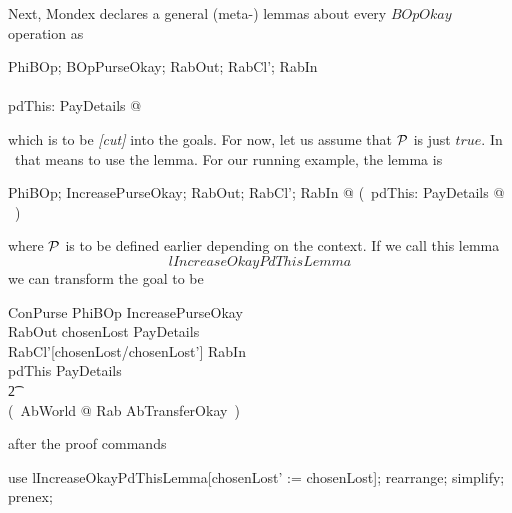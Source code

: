 Next, Mondex declares a general (meta-) lemmas about every $BOpOkay$ operation as
%
\begin{gzed}
   PhiBOp; BOpPurseOkay; RabOut; RabCl'; RabIn \\
   \shows \\
   \exists pdThis: PayDetails @ \pdThisPred
\end{gzed}
%
which is to be \textit{[cut]} into the goals. For now, let us assume that $\mathcal{P}$ is just $true$.
In \zeves\ that means to \textsf{use} the lemma. For our running example, the lemma is
%
\begin{gzed}
   \forall PhiBOp; IncreasePurseOkay; RabOut; RabCl'; RabIn @ (~\exists pdThis: PayDetails @ \pdThisPred~)
\end{gzed}
%
where $\mathcal{P}$ is to be defined earlier depending on the context. If we call this lemma
\[
lIncreaseOkayPdThisLemma
\]
we can transform the goal to be
%
\begin{gzed}
    \Delta ConPurse \land PhiBOp \land IncreasePurseOkay \\
    \land RabOut \land chosenLost \in \power PayDetails \\
    \land RabCl'[chosenLost/chosenLost'] \land RabIn \\
    \land pdThis \in PayDetails \land \pdThisPred \\
\t2 \implies \\
    (~\exists AbWorld @ Rab \land AbTransferOkay~)
\end{gzed}
%
after the proof commands
%
\begin{gzproof}
   use lIncreaseOkayPdThisLemma[chosenLost' := chosenLost];
   rearrange;
   simplify;
   prenex;
\end{gzproof}

